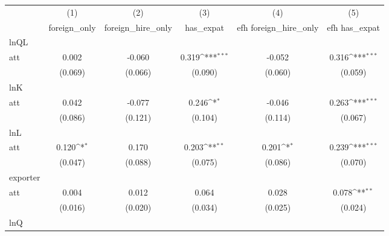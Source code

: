 {
\def\sym#1{\ifmmode^{#1}\else\(^{#1}\)\fi}
\begin{tabular}{l*{5}{c}}
\hline\hline
            &\multicolumn{1}{c}{(1)}&\multicolumn{1}{c}{(2)}&\multicolumn{1}{c}{(3)}&\multicolumn{1}{c}{(4)}&\multicolumn{1}{c}{(5)}\\
            &\multicolumn{1}{c}{foreign\_only}&\multicolumn{1}{c}{foreign\_hire\_only}&\multicolumn{1}{c}{has\_expat}&\multicolumn{1}{c}{efh foreign\_hire\_only}&\multicolumn{1}{c}{efh has\_expat}\\
\hline
lnQL        &                     &                     &                     &                     &                     \\
att         &       0.002         &      -0.060         &       0.319\sym{***}&      -0.052         &       0.316\sym{***}\\
            &     (0.069)         &     (0.066)         &     (0.090)         &     (0.060)         &     (0.059)         \\
\hline
lnK         &                     &                     &                     &                     &                     \\
att         &       0.042         &      -0.077         &       0.246\sym{*}  &      -0.046         &       0.263\sym{***}\\
            &     (0.086)         &     (0.121)         &     (0.104)         &     (0.114)         &     (0.067)         \\
\hline
lnL         &                     &                     &                     &                     &                     \\
att         &       0.120\sym{*}  &       0.170         &       0.203\sym{**} &       0.201\sym{*}  &       0.239\sym{***}\\
            &     (0.047)         &     (0.088)         &     (0.075)         &     (0.086)         &     (0.070)         \\
\hline
exporter    &                     &                     &                     &                     &                     \\
att         &       0.004         &       0.012         &       0.064         &       0.028         &       0.078\sym{**} \\
            &     (0.016)         &     (0.020)         &     (0.034)         &     (0.025)         &     (0.024)         \\
\hline
lnQ         &                     &                     &                     &                     &                     \\

\end{tabular}}
